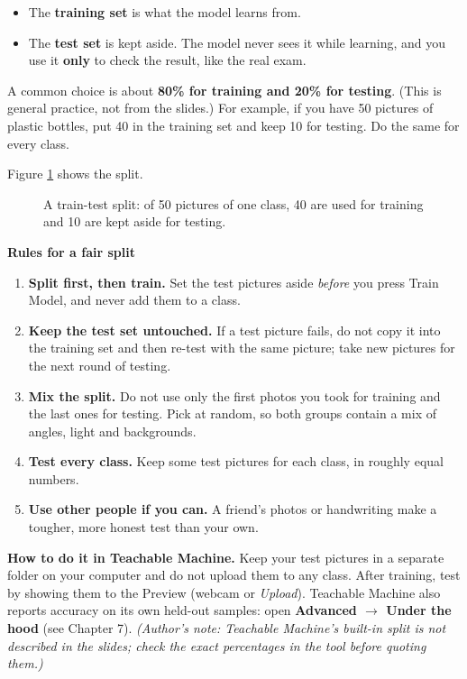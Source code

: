 \begin{itemize}
\item The \textbf{training set} is what the model learns from.
\item The \textbf{test set} is kept aside. The model never sees it while learning, and you use it \textbf{only} to check the result, like the real exam.
\end{itemize}

A common choice is about \textbf{80\% for training and 20\% for testing}. (This is general practice, not from the slides.) For example, if you have 50 pictures of plastic bottles, put 40 in the training set and keep 10 for testing. Do the same for every class.


Figure \ref{fig:train-test-split} shows the split.


\begin{figure}[htbp]
\centering
{}
\caption{A train-test split: of 50 pictures of one class, 40 are used for training and 10 are kept aside for testing.}\label{fig:train-test-split}
\end{figure}

\textbf{Rules for a fair split}


\begin{enumerate}
\item \textbf{Split first, then train.} Set the test pictures aside \emph{before} you press Train Model, and never add them to a class.
\item \textbf{Keep the test set untouched.} If a test picture fails, do not copy it into the training set and then re-test with the same picture; take new pictures for the next round of testing.
\item \textbf{Mix the split.} Do not use only the first photos you took for training and the last ones for testing. Pick at random, so both groups contain a mix of angles, light and backgrounds.
\item \textbf{Test every class.} Keep some test pictures for each class, in roughly equal numbers.
\item \textbf{Use other people if you can.} A friend’s photos or handwriting make a tougher, more honest test than your own.
\end{enumerate}

\textbf{How to do it in Teachable Machine.} Keep your test pictures in a separate folder on your computer and do not upload them to any class. After training, test by showing them to the Preview (webcam or \emph{Upload}). Teachable Machine also reports accuracy on its own held-out samples: open \textbf{Advanced \ensuremath{\rightarrow} Under the hood} (see Chapter 7). \emph{(Author’s note: Teachable Machine’s built-in split is not described in the slides; check the exact percentages in the tool before quoting them.)}


